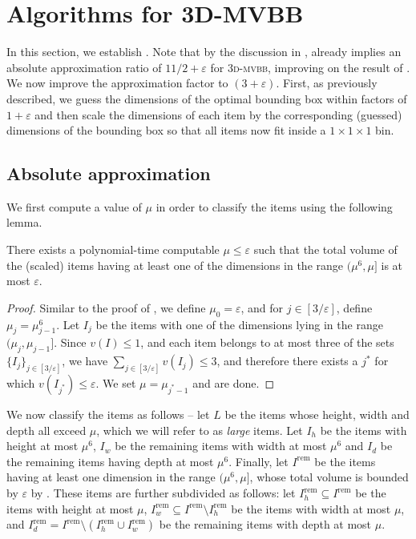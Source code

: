 \documentclass[a4paper,UKenglish,cleveref, autoref, thm-restate]{lipics-v2021}
\newcommand{\eps}{\varepsilon}
\newcommand{\tmvc}{\textsc{3d-mvbb}\xspace}
\begin{document}
\section{Algorithms for 3D-MVBB}
\label{sec:minvolumecontainer}

In this section, we establish . Note that by the discussion in ,  already implies an absolute approximation ratio of $11/2+\eps$ for \tmvc, improving on the result of \cite{li-cheng}. We now improve the approximation factor to $(3+\varepsilon)$. First, as previously described, we guess the dimensions of the optimal bounding box within factors of $1+\varepsilon$ and then scale the dimensions of each item by the corresponding (guessed) dimensions of the bounding box so that all items now fit inside a $1\times 1 \times 1$ bin. 

\subsection{Absolute approximation} 
We first compute a value of $\mu$ in order to classify the items using the following lemma.

\begin{lemma}
\label{lem:mediumitems}
     There exists a polynomial-time computable $\mu \le \varepsilon$ such that the total volume of the (scaled) items having at least one of the dimensions in the range $(\mu^6,\mu]$ is at most $\varepsilon$.
\end{lemma}
\begin{proof}
    Similar to the proof of , we define $\mu_0 = \eps$, and for $j\in [3/\eps]$, define $\mu_j = \mu_{j-1}^6$. Let $I_j$ be the items with one of the dimensions lying in the range $(\mu_j,\mu_{j-1}]$. Since $v(I)\le 1$, and each item belongs to at most three of the sets $\{I_j\}_{j\in [3/\eps]}$, we have $\sum_{j\in [3/\eps]} v(I_j) \le 3$, and therefore there exists a $j^*$ for which $v(I_{j^*}) \le \eps$. We set $\mu = \mu_{j^*-1}$ and are done.
\end{proof}

We now classify the items as follows -- let $L$ be the items whose height, width and depth all exceed $\mu$, which we will refer to as \emph{large} items. Let $I_h$ be the items with height at most $\mu^6$, $I_w$ be the remaining items with width at most $\mu^6$ and $I_d$ be the remaining items having depth at most $\mu^6$. Finally, let $I^{\text{rem}}$ be the items having at least one dimension in the range $(\mu^6,\mu]$, whose total volume is bounded by $\varepsilon$ by . These items are further subdivided as follows: let $I^{\text{rem}}_h \subseteq I^{\text{rem}}$ be the items with height at most $\mu$, $I^{\text{rem}}_w \subseteq I^{\text{rem}} \setminus I^{\text{rem}}_h$ be the items with width at most $\mu$, and $I^{\text{rem}}_d = I^{\text{rem}}\setminus (I^{\text{rem}}_h \cup I^{\text{rem}}_w)$ be the remaining items with depth at most $\mu$.
\end{document}
